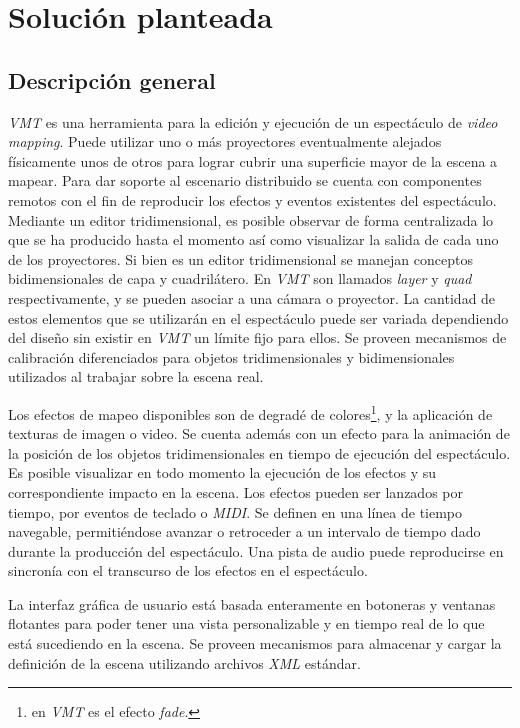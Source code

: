 \chapter{Solución planteada}
\section{Descripción general}%
\emph{VMT} es una herramienta para la edición y ejecución de un espectáculo de \emph{video mapping}. Puede utilizar uno o más proyectores eventualmente alejados físicamente unos de otros para lograr cubrir una superficie mayor de la escena a mapear. Para dar soporte al escenario distribuido se cuenta con componentes remotos con el fin de reproducir los efectos y eventos existentes del espectáculo. Mediante un editor tridimensional, es posible observar de forma centralizada lo que se ha producido hasta el momento así como visualizar la salida de cada uno de los proyectores. Si bien es un editor tridimensional se manejan conceptos bidimensionales de capa y cuadrilátero. En \emph{VMT} son llamados \emph{layer} y \emph{quad} respectivamente, y se pueden asociar a una cámara o proyector. La cantidad de estos elementos que se utilizarán en el espectáculo puede ser variada dependiendo del diseño sin existir en \emph{VMT} un límite fijo para ellos. Se proveen mecanismos de calibración diferenciados para objetos tridimensionales y bidimensionales utilizados al trabajar sobre la escena real.

Los efectos de mapeo disponibles son de degradé de colores\footnote{en \emph{VMT} es el efecto \emph{fade}.}, y la aplicación de texturas de imagen o video. Se cuenta además con un efecto para la animación de la posición de los objetos tridimensionales en tiempo de ejecución del espectáculo. Es posible visualizar en todo momento la ejecución de los efectos y su correspondiente impacto en la escena. Los efectos pueden ser lanzados por tiempo, por eventos de teclado o \emph{MIDI}. Se definen en una línea de tiempo navegable, permitiéndose avanzar o retroceder a un intervalo de tiempo dado durante la producción del espectáculo. Una pista de audio puede reproducirse en sincronía con el transcurso de los efectos en el espectáculo.

La interfaz gráfica de usuario está basada enteramente en botoneras y ventanas flotantes para poder tener una vista personalizable y en tiempo real de lo que está sucediendo en la escena. Se proveen mecanismos para almacenar y cargar la definición de la escena utilizando archivos \emph{XML} estándar.

